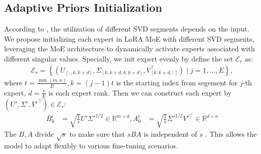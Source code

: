 \subsection{Adaptive Priors Initialization}

According to , the utilization of different SVD segments depends on the input. We propose initializing each expert in LoRA MoE with different SVD segments, leveraging the MoE architecture to dynamically activate experts associated with different singular values. Specially, we init expert evenly by define the set $\mathcal{E}_r$ as:
\begin{equation}
\begin{aligned}
    \mathcal{E}_r = \left\{(U_{ [:, k:k + d]}, \Sigma_{[k:k+d,k:k+d]}, V_{[k:k+d,:]}^\top) \mid j = 1, \dots, E \right\},
\end{aligned}
\end{equation}
where $t=\frac{\min(m,n)}{E},k=(j-1)t$ is the starting index from segement for $j$-th expert, $d=\frac{r}{E}$ is each expert rank. 
Then we can construct each expert by \(\left( U', \Sigma', V'^{\top} \right) \in \mathcal{E}_r\):
\begin{equation}
\begin{aligned}
    B^i_0 &= \sqrt{\frac{1}{s}} U' \Sigma'^{1/2} \in \mathbb{R}^{m \times d}, A^i_0 &= \sqrt{\frac{1}{s}} \Sigma'^{1/2} V'^{\top} \in \mathbb{R}^{d \times n}
\end{aligned}
\end{equation}
The $B,A$ divide $\sqrt{s}$ to make sure that $sBA$ is independent of $s$ \cite{meng2024pissa}. This allows the model to adapt flexibly to various fine-tuning scenarios. 

